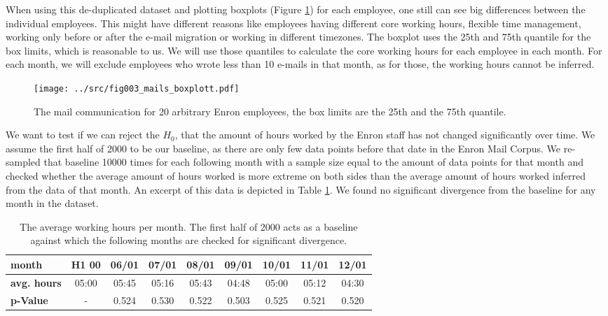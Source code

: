 \documentclass{article}
\begin{document}
When using this de-duplicated dataset and plotting boxplots (Figure
\ref{fig:mailboxplot}) for each employee, one still can see big differences
between the individual employees. This might have different reasons like
employees having different core working hours, flexible time management, working
only before or after the e-mail migration or working in different timezones. The
boxplot uses the 25th and 75th quantile for the box limits, which is reasonable
to us. We will use those quantiles to calculate the core working hours for each
employee in each month. For each month, we will exclude employees who wrote less
than 10 e-mails in that month, as for those, the working hours cannot be
inferred. 

\begin{figure}
  \centering
  \texttt{[image: ../src/fig003\_mails\_boxplott.pdf]}
   \caption{The mail communication for 20 arbitrary Enron employees, the box
   limits are the 25th and the 75th quantile.}
  \label{fig:mailboxplot}
\end{figure}

We want to test if we can reject the $H_0$, that the amount of hours worked by
the Enron staff has not changed significantly over time. We assume the first
half of 2000 to be our baseline, as there are only few data points before that
date in the Enron Mail Corpus. We re-sampled that baseline 10000 times for each
following month with a sample size equal to the amount of data points for that
month and checked whether the average amount of hours worked is more extreme on
both sides than the average amount of hours worked inferred from the data of
that month. An excerpt of this data is depicted in Table \ref{ta:pvalues}. We
found no significant divergence from the baseline for any month in the dataset.

\begin{table}
  \caption{The average working hours per month. The first half of 2000 acts as a
  baseline against which the following months are checked for significant
  divergence.}
  \centering
  \begin{tabular}{|l|c|c|c|c|c|c|c|c|}
    \hline
    \textbf{month} & H1 00 & 06/01 & 07/01 & 08/01 & 09/01 & 10/01 & 11/01 &
    12/01 \\
    \hline
    \textbf{avg. hours} & 05:00 & 05:45 & 05:16 & 05:43 & 04:48 & 05:00 & 05:12
    & 04:30 \\
    \hline
    \textbf{p-Value} & - & 0.524 & 0.530 & 0.522 & 0.503 & 0.525 & 0.521 & 0.520
    \\
    \hline
  \end{tabular}
  \label{ta:pvalues}
\end{table}
\end{document}
